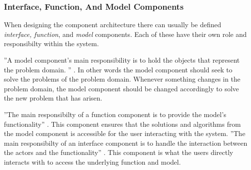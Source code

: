 \subsubsection*{Interface, Function, And Model Components}

When designing the component architecture there can usually be defined \textit{interface, function}, and \textit{model} components.
Each of these have their own role and responsibilty within the system.

''A model component's main responsibility is to hold the objects that represent the problem domain. '' \citep[p.~203]{Rod-Aalborg}.
In other words the model component should seek to solve the problems of the problem domain.
Whenever something changes in the problem domain, the model component should be changed accordingly to solve the new problem that has arisen.

''The main responsibilty of a function component is to provide the model's functionality'' \citep[p.~205]{Rod-Aalborg}.
This component ensures that the solutions and algorithms from the model component is accessible for the user interacting with the system.
''The main responsibilty of an interface component is to handle the interaction between the actors and the functionality'' \citep[p.~207]{Rod-Aalborg}.
This component is what the users directly interacts with to access the underlying function and model.
